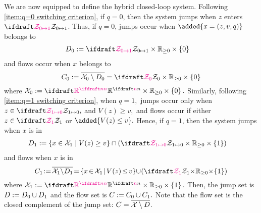 We are now equipped to define the hybrid closed-loop system.
Following \ref{item:q=0 switching criterion}, 
if $q = 0$, then the system 
jumps when $z$ enters $\calZswitchtoone$.  
Thus, if $q=0$, jumps occur when $\added{x = (z, v, q)}$ belongs to 
\begin{align} 
    D_{0} 
    &:= \calZswitchtoone \times \nnreals \times \{0\}
    \label{eq:D_0}
\end{align} 
and flows occur when $x$ belongs to
\begin{equation}
    C_{0} := \closure{\calX_0 \setminus D_0} 
    = \calZholdzero \times \nnreals \times \setdef{0} 
    \label{eq:C_0}
\end{equation}
where $\calX_0:= \plantstatespace \times \nnreals \times \setdef{0}.$ %
Similarly, following \ref{item:q=1 switching criterion},
when $q = 1,$ jumps occur only when $z \in \calZswitchtozero,$ 
and $V(z) \geq v,$ and flows occur if 
either $z\in \calZholdone$ or $\added{V(z) \leq v}.$
Hence, if $q = 1$, then the system jumps when $x$ is in
\begin{align} 
    D_{1} 
    &:= \{x \in \calX_1 \mid V(z) \geq v\} 
    \intersect \left( \calZswitchtozero\times\nnreals\times\setdef{1} \right)
    \label{eq:D_1}
\end{align} 
and flows when $x$ is in 
\begin{equation}
    \squeezespaces{0.5}
    C_{1} := \closure{\calX_1 \!\setminus\! D_1} 
    = \{x \in \calX_1 \mid V(z) \leq v\} 
        \!\union\! \left( \calZholdone \!\times\!\nnreals\!\times\!\setdef{1} \right)
    \label{eq:C_1}
\end{equation}
where $\calX_1:= \plantstatespace \times \nnreals \times \setdef{1}.$ 
Then, the jump set is $D := D_0 \cup D_1$ 
and the flow set is $C := C_0 \cup C_1.$
Note that the flow set is 
the closed complement of the jump set:
$C = \overline{{\mathcal{X}} \setminus D}$.

